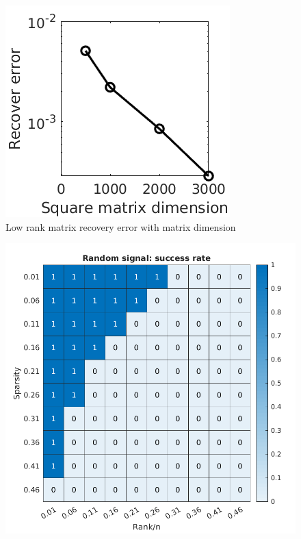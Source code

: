 \documentclass[12pt]{extarticle}
\newcommand{\<}{\langle}
\renewcommand{\>}{\rangle}
\theoremstyle{definition}
\begin{document}
\begin{figure}
\centering
\includegraphics[width=0.3\linewidth]{Error_dim.png}
\caption{Low rank matrix recovery error with matrix dimension}
\label{dim}
\end{figure}

\begin{figure}
    \label{trans}
    \centering
    \begin{minipage}{0.45\textwidth}
    \includegraphics[width=\linewidth]{Random_TransitionPlot.png}
    \end{minipage} \begin{minipage}{0.45\textwidth}

\end{minipage}
\end{figure}
\end{document}
